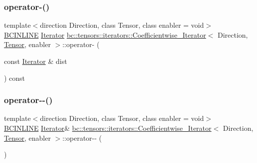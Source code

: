 \subsubsection{\texorpdfstring{operator-\/()}{operator-()}\hspace{0.1cm}{\footnotesize\ttfamily [2/2]}}
{\footnotesize\ttfamily template$<$direction Direction, class Tensor, class enabler = void$>$ \\
\hyperlink{common_8h_a6699e8b0449da5c0fafb878e59c1d4b1}{B\+C\+I\+N\+L\+I\+NE} \hyperlink{structbc_1_1tensors_1_1iterators_1_1Coefficientwise__Iterator_a313f76f47e60a806035279a36a84f835}{Iterator} \hyperlink{structbc_1_1tensors_1_1iterators_1_1Coefficientwise__Iterator}{bc\+::tensors\+::iterators\+::\+Coefficientwise\+\_\+\+Iterator}$<$ Direction, \hyperlink{namespacebc_a659391e47ab612be3ba6c18cf9c89159}{Tensor}, enabler $>$\+::operator-\/ (\begin{DoxyParamCaption}\item[{const \hyperlink{structbc_1_1tensors_1_1iterators_1_1Coefficientwise__Iterator_a313f76f47e60a806035279a36a84f835}{Iterator} \&}]{dist }\end{DoxyParamCaption}) const\hspace{0.3cm}{\ttfamily [inline]}}

\mbox{\label{structbc_1_1tensors_1_1iterators_1_1Coefficientwise__Iterator_a1cb9dc7f2eef7b65539d6672c1841ae4}} 
\subsubsection{\texorpdfstring{operator-\/-\/()}{operator--()}\hspace{0.1cm}{\footnotesize\ttfamily [1/2]}}
{\footnotesize\ttfamily template$<$direction Direction, class Tensor, class enabler = void$>$ \\
\hyperlink{common_8h_a6699e8b0449da5c0fafb878e59c1d4b1}{B\+C\+I\+N\+L\+I\+NE} \hyperlink{structbc_1_1tensors_1_1iterators_1_1Coefficientwise__Iterator_a313f76f47e60a806035279a36a84f835}{Iterator}\& \hyperlink{structbc_1_1tensors_1_1iterators_1_1Coefficientwise__Iterator}{bc\+::tensors\+::iterators\+::\+Coefficientwise\+\_\+\+Iterator}$<$ Direction, \hyperlink{namespacebc_a659391e47ab612be3ba6c18cf9c89159}{Tensor}, enabler $>$\+::operator-\/-\/ (\begin{DoxyParamCaption}{ }\end{DoxyParamCaption})\hspace{0.3cm}{\ttfamily [inline]}}

